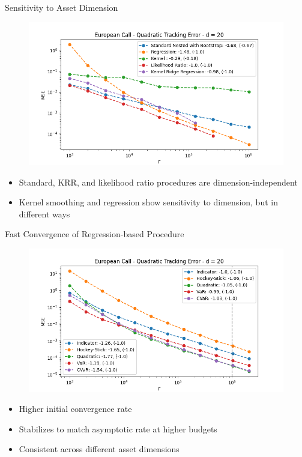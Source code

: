 \documentclass[9pt,handout]{beamer}
\begin{document}
\begin{frame}{Sensitivity to Asset Dimension}

    \begin{figure}
        \includegraphics[width=\textwidth]{../project1/figures/figure2b.png}
    \end{figure}
    
    \begin{itemize}
        \item Standard, KRR, and likelihood ratio procedures are dimension-independent
        \item Kernel smoothing and regression show sensitivity to dimension, but in different ways
    \end{itemize}
    
\end{frame}

\begin{frame}{Fast Convergence of Regression-based Procedure}

\begin{figure}
    \includegraphics[width=\textwidth]{../project1/figures/figure3.png}
\end{figure}

\begin{itemize}
    \item Higher initial convergence rate
    \item Stabilizes to match asymptotic rate at higher budgets
    \item Consistent across different asset dimensions
\end{itemize}

\end{frame}
\end{document}
